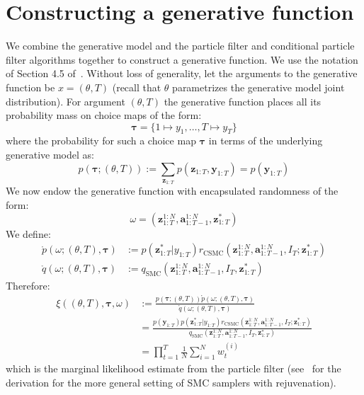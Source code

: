 \documentclass[11pt]{article}
\newcommand{\z}{\mathbf{z}}
\newcommand{\abold}{\mathbf{a}}
\newcommand{\y}{\mathbf{y}}
\newcommand\tdict[0]{\boldsymbol{\tau}}
\begin{document}
\section{Constructing a generative function}
We combine the generative model and the particle filter and conditional particle filter algorithms together to construct a generative function.
We use the notation of Section 4.5 of~\citet{cusumano-towner-thesis}.
Without loss of generality, let the arguments to the generative function be $x = (\theta, T)$ (recall that $\theta$ parametrizes the generative model joint distribution).
For argument $(\theta, T)$ the generative function places all its probability mass on choice maps of the form:
\[
\tdict = \{1 \mapsto y_1, \ldots, T \mapsto y_T\}
\]
where the probability for such a choice map $\tdict$ in terms of the underlying generative model as:
\[
    p(\tdict; (\theta, T)) := \sum_{\z_{1:T}} p(\z_{1:T}, \y_{1:T}) = p(\y_{1:T})
\]
We now endow the generative function with encapsulated randomness of the form:
\[
\omega = (\z_{1:T}^{1:N}, \abold_{1:T-1}^{1:N}, \z_{1:T}^*)
\]
We define:
\begin{align*}
\mathring{p}(\omega; (\theta, T), \tdict) &:= p(\z_{1:T}^* | y_{1:T}) r_{\mathrm{CSMC}}(\z_{1:T}^{1:N}, \abold_{1:T-1}^{1:N}, I_T; \z_{1:T}^*)\\
\mathring{q}(\omega; (\theta, T), \tdict) &:= q_{\mathrm{SMC}}(\z_{1:T}^{1:N}, \abold_{1:T-1}^{1:N}, I_T, \z_{1:T}^*)
\end{align*}
Therefore:
\begin{align*}
\xi((\theta, T), \tdict, \omega)
    &:= \frac{p(\tdict; (\theta, T)) \mathring{p}(\omega; (\theta, T), \tdict)}{\mathring{q}(\omega; (\theta, T), \tdict)}\\
    &= \frac{p(\y_{1:T}) p(\z_{1:T}^* | y_{1:T}) r_{\mathrm{CSMC}}(\z_{1:T}^{1:N}, \abold_{1:T-1}^{1:N}, I_T; \z_{1:T}^*)}{q_{\mathrm{SMC}}(\z_{1:T}^{1:N}, \abold_{1:T-1}^{1:N}, I_T, \z_{1:T}^*)}\\
    &= \prod_{t=1}^T \frac{1}{N} \sum_{i=1}^N w^{(i)}_t
\end{align*}
which is the marginal likelihood estimate from the particle filter (see~\citet{cusumano2017aide} for the derivation for the more general setting of SMC samplers with rejuvenation).
\end{document}
